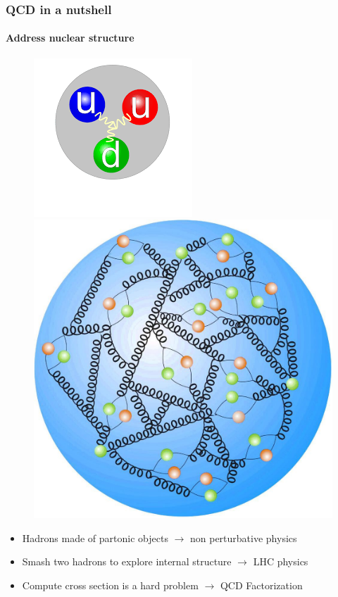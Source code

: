 \documentclass[aspectratio=43]{beamer}
\begin{document}
\begin{frame}

	\frametitle{QCD in a nutshell}
	\framesubtitle{Address nuclear structure}
	
	\begin{figure}
		\includegraphics[width = 0.5\linewidth]{plots/proton.png}
		\endminipage\hfill
		\includegraphics[width = 0.4\linewidth]{plots/proton2.jpg}
		\endminipage
	\end{figure}
	
	\begin{itemize}
		\item Hadrons made of partonic objects $\longrightarrow$ non perturbative physics
		\item Smash two hadrons to explore internal structure $\longrightarrow$ LHC physics
		\item Compute cross section is a {\color{red}hard problem} $\longrightarrow$ {\color{blue}QCD Factorization}
	\end{itemize}

\end{frame}
\end{document}
